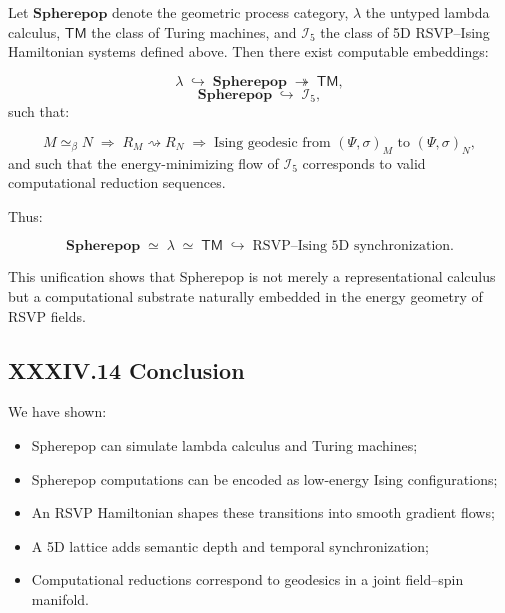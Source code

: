 \documentclass[12pt,letterpaper]{article}
\begin{document}
\begin{theorem}
Let $\mathbf{Spherepop}$ denote the geometric process category,  
$\lambda$ the untyped lambda calculus,  
$\mathsf{TM}$ the class of Turing machines,  
and $\mathcal{I}_5$ the class of 5D RSVP–Ising Hamiltonian systems defined above.  
Then there exist computable embeddings:

\[
\lambda \;\hookrightarrow\; \mathbf{Spherepop} \;\twoheadrightarrow\; \mathsf{TM},
\]
\[
\mathbf{Spherepop} \;\hookrightarrow\; \mathcal{I}_5,
\]
such that:

\[
M \simeq_{\beta} N
\;\Longrightarrow\;
R_M \rightsquigarrow R_N
\;\Longrightarrow\;
\text{Ising geodesic from } (\Psi,\sigma)_M \text{ to } (\Psi,\sigma)_N,
\]
and such that the energy-minimizing flow of $\mathcal{I}_5$ corresponds to valid computational reduction sequences.

Thus:

\[
\boxed{
\mathbf{Spherepop} \;\simeq\; \lambda \;\simeq\; \mathsf{TM}
\;\hookrightarrow\;
\text{RSVP--Ising 5D synchronization}.
}
\]

\end{theorem}

This unification shows that Spherepop is not merely a representational calculus but a computational substrate naturally embedded in the energy geometry of RSVP fields.

\subsection{XXXIV.14 Conclusion}

We have shown:

\begin{itemize}
    \item Spherepop can simulate lambda calculus and Turing machines;
    \item Spherepop computations can be encoded as low-energy Ising configurations;
    \item An RSVP Hamiltonian shapes these transitions into smooth gradient flows;
    \item A 5D lattice adds semantic depth and temporal synchronization;
    \item Computational reductions correspond to geodesics in a joint field–spin manifold.
\end{itemize}
\end{document}
